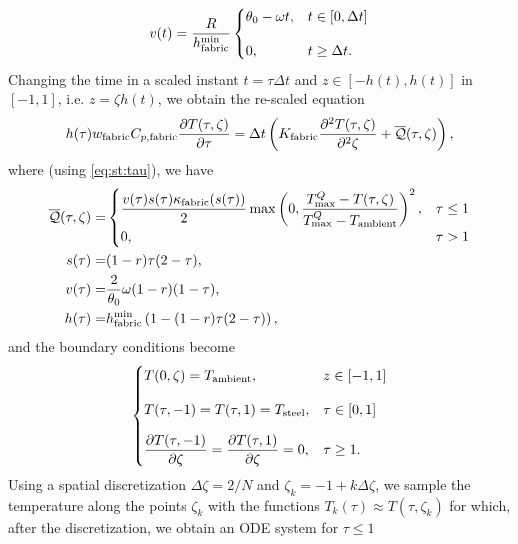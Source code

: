 \begin{equation}
  v(t) =
  \dfrac{R}{h_{\mathrm{fabric}}^{\min}}
  \begin{cases}
  \theta_0-\omega t, & t\in[0,\Delta t] \\[1em]
  0, &  t\geq \Delta t.
  \end{cases}
\end{equation}
Changing the time in a scaled instant $t = \tau\Delta t$ and $z\in[-h(t),h(t)]$ in $[-1,1]$, i.e. $z=\zeta h(t)$, we obtain the re-scaled equation
\begin{equation}\label{pde:heat:scaled}
 h(\tau)w_{\mathrm{fabric}}C_{p,\textrm{fabric}} \dfrac{\partial T(\tau,\zeta)}{\partial\tau}
 = 
 \Delta t \left(K_{\mathrm{fabric}}\dfrac{\partial^2 T(\tau,\zeta)}{\partial^2 \zeta}+\overline{\mathcal{Q}}(\tau,\zeta)\right),
\end{equation}
where (using \eqref{eq:st:tau}), we have
\begin{equation}
  \begin{split}
  \overline{\mathcal{Q}}(\tau,\zeta)=&
  \begin{cases}
  \dfrac{v(\tau)s(\tau)\kappa_{\mathrm{fabric}}(s(\tau))}{2}\max\left(0,\dfrac{{T_{\max}^Q}-T(\tau,\zeta)}{{T_{\max}^Q}-T_{\textrm{ambient}}}\right)^2,
  & \tau \leq 1 \\
  0, & \tau > 1
  \end{cases}
  \\
   s(\tau)
   = & (1-r)\tau(2-\tau), \\
   v(\tau) = & \dfrac{2}{\theta_0}\omega(1-r)(1-\tau), \\
   h(\tau) = &
   h_{\mathrm{fabric}}^{\min} \left(1-(1-r)\tau(2-\tau)\right),
  \end{split}
\end{equation}
and the boundary conditions become
\begin{equation}\label{pde:bc:scaled}
  \begin{cases}
  T(0,\zeta) = T_{\textrm{ambient}}, & z\in[-1,1] \\[1em]
  T(\tau,-1) = T(\tau,1) = T_{\mathrm{steel}}, & \tau\in[0,1] \\[1em]
  \dfrac{\partial T(\tau,-1)}{\partial \zeta} =
  \dfrac{\partial T(\tau,1)}{\partial \zeta}= 0, & \tau\geq 1.
  \end{cases}
\end{equation}
Using a spatial discretization  $\Delta\zeta=2/N$ and $\zeta_k=-1+k\Delta\zeta$, we sample the temperature along the points $\zeta_k$ with the functions $T_k(\tau)\approx T(\tau,\zeta_k)$ for which, after the discretization, we obtain an ODE system for $\tau \leq 1$
